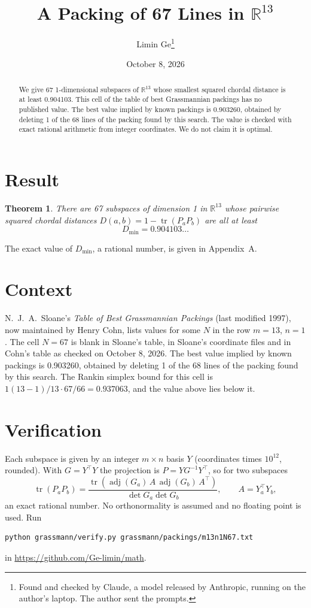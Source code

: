 \documentclass[11pt,a4paper]{article}
\title{A Packing of 67 Lines in $\mathbb{R}^{13}$}
\author{Limin Ge\thanks{Found and checked by Claude, a model released by Anthropic, running on the author's laptop. The author sent the prompts.}}
\date{October 8, 2026}
\newtheorem*{theorem}{Theorem}
\begin{document}
\maketitle
\begin{abstract}
We give 67 1-dimensional subspaces of $\mathbb{R}^{13}$ whose smallest squared chordal distance is at least 0.904103. This cell of the table of best Grassmannian packings has no published value. The best value implied by known packings is 0.903260, obtained by deleting 1 of the 68 lines of the packing found by this search. The value is checked with exact rational arithmetic from integer coordinates. We do not claim it is optimal.
\end{abstract}

\section{Result}
\begin{theorem}
There are 67 subspaces of dimension 1 in $\mathbb{R}^{13}$ whose pairwise squared chordal distances $D(a,b) = 1 - \operatorname{tr}(P_aP_b)$ are all at least
\[ D_{\min} = 0.904103\ldots \]
\end{theorem}
The exact value of $D_{\min}$, a rational number, is given in Appendix~A.


\section{Context}
N.~J.~A.~Sloane's \emph{Table of Best Grassmannian Packings} (last modified 1997), now maintained by Henry Cohn, lists values for some $N$ in the row $m=13$, $n=1$. The cell $N=67$ is blank in Sloane's table, in Sloane's coordinate files and in Cohn's table as checked on October 8, 2026. The best value implied by known packings is 0.903260, obtained by deleting 1 of the 68 lines of the packing found by this search. The Rankin simplex bound for this cell is $1(13-1)/13\cdot 67/66 = 0.937063$, and the value above lies below it.


\section{Verification}
Each subspace is given by an integer $m\times n$ basis $Y$ (coordinates times $10^{12}$, rounded). With $G=Y^\top Y$ the projection is $P=YG^{-1}Y^\top$, so for two subspaces
\[ \operatorname{tr}(P_aP_b)=\frac{\operatorname{tr}(\operatorname{adj}(G_a)\,A\,\operatorname{adj}(G_b)\,A^\top)}{\det G_a\det G_b},\qquad A=Y_a^\top Y_b, \]
an exact rational number. No orthonormality is assumed and no floating point is used. Run
\begin{verbatim}
python grassmann/verify.py grassmann/packings/m13n1N67.txt
\end{verbatim}
in \url{https://github.com/Ge-limin/math}.
\end{document}
